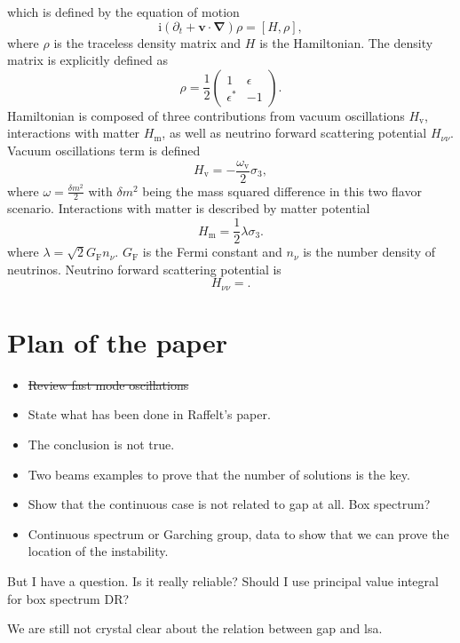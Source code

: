 \documentclass[%
 reprint,
 amsmath,amssymb,
 aps,
 prd
]{revtex4-1}
\newcommand{\ii}{\mathrm i}
\begin{document}
which is defined by the equation of motion
\begin{equation}
\ii (\partial_t + \mathbf v\cdot \boldsymbol{\nabla}) \rho = \left[ H, \rho \right],
\end{equation}
where $\rho$ is the traceless density matrix and $H$ is the Hamiltonian. The density matrix is explicitly defined as
\begin{equation}
   \rho = \frac{1}{2} \begin{pmatrix}
   1 & \epsilon \\
   \epsilon^* & -1
\end{pmatrix}.
\end{equation}
Hamiltonian is composed of three contributions from vacuum oscillations $H_{\mathrm v}$, interactions with matter $H_{\mathrm m}$, as well as neutrino forward scattering potential $H_{\nu\nu}$. Vacuum oscillations term is defined
\begin{equation}
   H_{\mathrm v} = -\frac{\omega_{\mathrm v}}{2} \sigma_3,
\end{equation}
where $\omega = \frac{\delta m^2}{2}$ with $\delta m^2$ being the mass squared difference in this two flavor scenario. Interactions with matter is described by matter potential
\begin{equation}
   H_{\mathrm m} = \frac{1}{2}\lambda \sigma_3.
\end{equation}
where $\lambda = \sqrt{2}G_{\mathrm F} n_\nu$. $G_{\mathrm F}$ is the Fermi constant and $n_\nu$ is the number density of neutrinos. Neutrino forward scattering potential is
\begin{equation}
H_{\nu\nu} = .
\end{equation}





\section{\label{sec:outline}Plan of the paper}



\begin{itemize}
    \item \sout{Review fast mode oscillations}
    \item State what has been done in Raffelt's paper.
    \item The conclusion is not true.
    \item Two beams examples to prove that the number of solutions is the key.
    \item Show that the continuous case is not related to gap at all. Box spectrum?
    \item Continuous spectrum or Garching group, data to show that we can prove the location of the instability.
\end{itemize}


But I have a question. Is it really reliable? Should I use principal value integral for box spectrum DR?

We are still not crystal clear about the relation between gap and lsa.







\end{document}
